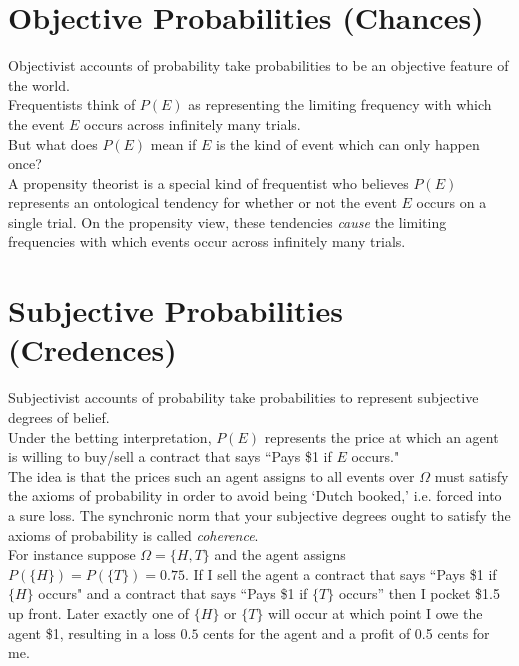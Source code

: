 \documentclass[11pt]{article}
\theoremstyle{definition}
\theoremstyle{plain}
\begin{document}
\section{Objective Probabilities (Chances)}
Objectivist accounts of probability take probabilities to be an objective feature of the world. 
\\
Frequentists think of $P(E)$ as representing the limiting frequency with which the event $E$ occurs across infinitely many trials.
\\
But what does $P(E)$ mean if $E$ is the kind of event which can only happen once?
\\
A propensity theorist is a special kind of frequentist who believes $P(E)$ represents an ontological tendency for whether or not the event $E$ occurs on a single trial. On the propensity view, these tendencies \emph{cause} the limiting frequencies with which events occur across infinitely many trials.

\section{Subjective Probabilities (Credences)}
Subjectivist accounts of probability take probabilities to represent subjective degrees of belief.
\\
Under the betting interpretation, $P(E)$ represents the price at which an agent is willing to buy/sell a contract that says ``Pays \$1 if $E$ occurs."
\\
The idea is that the prices such an agent assigns to all events over $\Omega$ must satisfy the axioms of probability in order to avoid being `Dutch booked,' i.e. forced into a sure loss. The synchronic norm that your subjective degrees ought to satisfy the axioms of probability is called \emph{coherence}.
\\
For instance suppose $\Omega=\{H,T\}$ and the agent assigns $P(\{H\})=P(\{T\})=0.75$. If I sell the agent a contract that says ``Pays \$1 if $\{H\}$ occurs" and a contract that says ``Pays \$1 if $\{T\}$ occurs'' then I pocket \$1.5 up front. Later exactly one of $\{H\}$ or $\{T\}$ will occur at which point I owe the agent 	\$1, resulting in a loss $0.5$ cents for the agent and a profit of 0.5 cents for me. 
\end{document}
